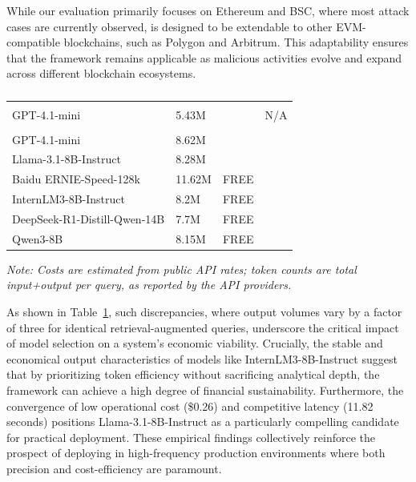 While our evaluation primarily focuses on Ethereum and BSC, where most attack cases are currently observed, \approach{} is designed to be extendable to other EVM-compatible blockchains, such as Polygon and Arbitrum. This adaptability ensures that the framework remains applicable as malicious activities evolve and expand across different blockchain ecosystems.

\begin{table}[t]
	\caption{}
	\label{tab:api_cost_comparison}
	\centering
	\small
	\renewcommand{\arraystretch}{1}
	\setlength{\tabcolsep}{1pt}
	\begin{tabular}
		{
		>{\raggedright}p{}
			>{\centering\arraybackslash}p{}
			>{\centering\arraybackslash}p{}
			>{\centering\arraybackslash}p{}}
		\toprule
		\text{Model} & \text{Tokens} & \text{Cost(\$)} & \Blue{Avg. Time (s)}\\
		\midrule
		\multicolumn{4}{l}{\textbf{\done{} (91 samples)}} \\
		\midrule
		GPT-4.1-mini & 5.43M & 2.24 & N/A\\
		\midrule
		\multicolumn{4}{l}{\textbf{\dsystem{} (728 samples)}} \\
		\midrule
		GPT-4.1-mini & 8.62M & 3.86 &  15.02\\
		Llama-3.1-8B-Instruct & 8.28M & 0.26  & 11.82\\
		Baidu ERNIE-Speed-128k & 11.62M & FREE & 12.66\\
		InternLM3-8B-Instruct & 8.2M & FREE & 12.70\\
		DeepSeek-R1-Distill-Qwen-14B & 7.7M & FREE & 32.31\\
		Qwen3-8B & 8.15M & FREE  & 37.54\\
		\bottomrule
	\end{tabular}
	
	\smallskip\scriptsize\textit{Note: Costs are estimated from public API rates; token counts are total input+output per query, as reported by the API providers.}
\end{table}


As shown in Table~\ref{tab:api_cost_comparison}, such discrepancies, where output volumes vary by a factor of three for identical retrieval-augmented queries, underscore the critical impact of model selection on a system's economic viability. Crucially, the stable and economical output characteristics of models like InternLM3-8B-Instruct suggest that by prioritizing token efficiency without sacrificing analytical depth, the \approach{} framework can achieve a high degree of financial sustainability. Furthermore, the convergence of low operational cost (\$0.26) and competitive latency (11.82 seconds) positions Llama-3.1-8B-Instruct as a particularly compelling candidate for practical deployment. These empirical findings collectively reinforce the prospect of deploying \approach{} in high-frequency production environments where both precision and cost-efficiency are paramount.

